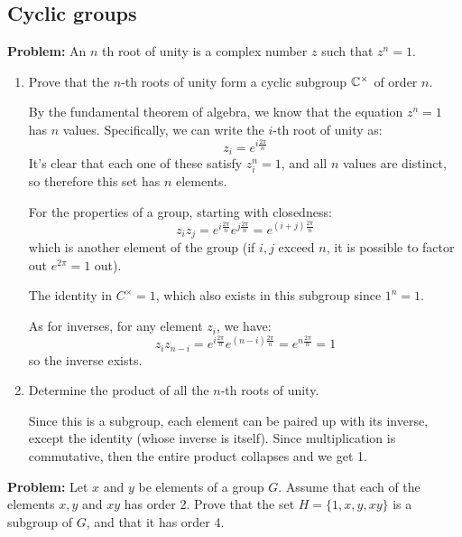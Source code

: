 \documentclass[10pt]{article}
\newenvironment{problem}{\textbf{Problem:}}{}
\begin{document}
\subsection{Cyclic groups}
\begin{problem}
	An \( n \) th root of unity is a complex number \( z \) such that \( z^{n} = 1 \). 
	\begin{enumerate}[label=\alph*)]
		\item Prove that the \( n \)-th roots of unity form a cyclic subgroup 
			\( \mathbb C^{\times} \) of order \( n \). 

			\begin{solution}
				By the fundamental theorem of algebra, we know that 
				the equation \( z^{n} = 1 \) has \( n \) values. Specifically, 
				we can write the \( i \)-th root of unity as:
				\[
				z_i = e^{i\frac{2\pi}{n}}
				\] 
				It's clear that each one of these satisfy \( z_i^{n} = 1 \), and all 
				\( n \) values are distinct, so therefore this set has \( n \) 
				elements.  

				For the properties of a group, starting with closedness:
				\[
				z_iz_j = e^{i \frac{2\pi}{n}} e^{j \frac{2\pi}{n}} 
				= e^{(i + j) \frac{2\pi}{n}}
				\] 
				which is another element of the group (if \( i, j \) exceed \( n \), 
				it is possible to factor out \( e^{2 \pi} = 1\) out). 

				The identity in \( C^{\times} = 1 \), which also exists 
				in this subgroup since \( 1^{n} = 1 \). 

				As for inverses, for any element \( z_i \), we have:
				\[
				z_i z_{n - i} = e^{i \frac{2 \pi}{n}}e^{(n - i) \frac{2 \pi}{n}}
				= e^{n \frac{2 \pi}{n}} = 1
				\] 
				so the inverse exists. 
			\end{solution}
		\item Determine the product of all the \( n \)-th roots of unity. 

			\begin{solution}
				Since this is a subgroup, each element can be paired up with its 
				inverse, except the identity (whose inverse is itself). Since 
				multiplication is commutative, then the entire product collapses
				and we get 1. 
			\end{solution}
	\end{enumerate}
\end{problem}

\begin{problem}
	Let \( x \) and \( y \) be elements of a group \( G \). Assume that each of the 
	elements \( x, y \) and \( xy \) has order 2. Prove that the set 
	\( H = \{1, x, y, xy\}  \) is a subgroup of \( G \), and that it 
	has order 4.
\end{problem}
\end{document}
